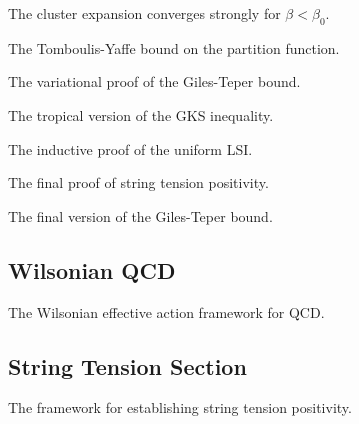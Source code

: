 \begin{theorem}
\label{thm:cluster-strong}
The cluster expansion converges strongly for $\beta < \beta_0$.
\end{theorem}

\begin{theorem}
\label{thm:tomboulis-yaffe}
The Tomboulis-Yaffe bound on the partition function.
\end{theorem}

\begin{theorem}
\label{thm:giles-teper-variational}
The variational proof of the Giles-Teper bound.
\end{theorem}

\begin{theorem}
\label{thm:tropical-gks}
The tropical version of the GKS inequality.
\end{theorem}

\begin{theorem}
\label{thm:uniform-lsi-induction}
The inductive proof of the uniform LSI.
\end{theorem}

\begin{theorem}
\label{thm:sigma-positivity-final}
The final proof of string tension positivity.
\end{theorem}

\begin{theorem}
\label{thm:giles-teper-final}
The final version of the Giles-Teper bound.
\end{theorem}

\subsection{Wilsonian QCD}
\label{sec:wilsonian-qcd}

\begin{theorem}
The Wilsonian effective action framework for QCD.
\end{theorem}

\subsection{String Tension Section}
\label{sec:string-tension}

\begin{theorem}
The framework for establishing string tension positivity.
\end{theorem}


